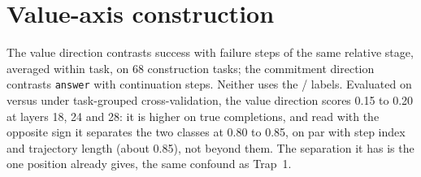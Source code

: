 \section{Value-axis construction}
\label{app:value}
The value direction contrasts success with failure steps of the same relative stage, averaged within task, on 68 construction tasks; the commitment direction contrasts \texttt{answer} with continuation steps. Neither uses the \fsp/\fsm{} labels. Evaluated on \fsp{} versus \fsm{} under task-grouped cross-validation, the value direction scores 0.15 to 0.20 at layers 18, 24 and 28: it is higher on true completions, and read with the opposite sign it separates the two classes at 0.80 to 0.85, on par with step index and trajectory length (about 0.85), not beyond them. %
The separation it has is the one position already gives, the same confound as Trap~1.
\FloatBarrier
